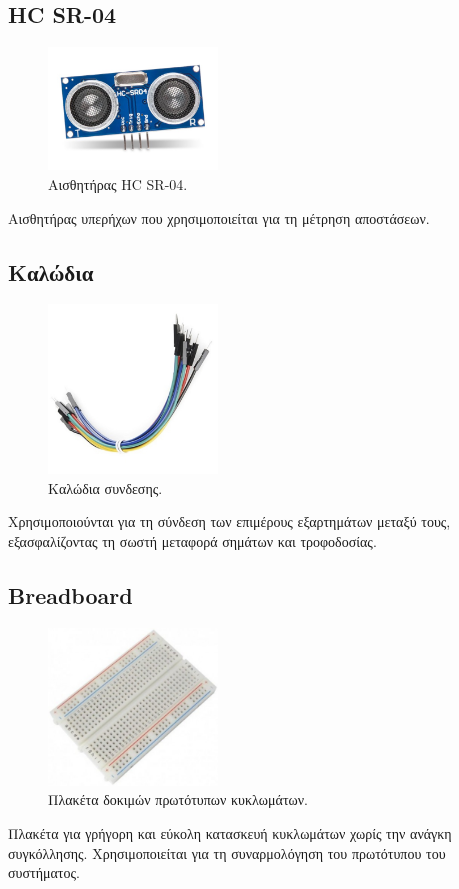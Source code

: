 \documentclass[conference]{IEEEtran}
\begin{document}
\subsection{HC SR-04}
\begin{figure}[H]
	\centerline{\includegraphics[width=0.4\textwidth]{assets/hcsr04.jpeg}}
	\caption{Αισθητήρας HC SR-04.}
\end{figure}
Αισθητήρας υπερήχων που χρησιμοποιείται για τη μέτρηση αποστάσεων.

\subsection{Καλώδια}
\begin{figure}[H]
	\centerline{\includegraphics[width=0.4\textwidth]{assets/cables.jpg}}
	\caption{Καλώδια συνδεσης.}
\end{figure}
Χρησιμοποιούνται για τη σύνδεση των επιμέρους εξαρτημάτων μεταξύ τους, εξασφαλίζοντας τη σωστή μεταφορά σημάτων και τροφοδοσίας.

\subsection{Breadboard}
\begin{figure}[H]
	\centerline{\includegraphics[width=0.4\textwidth]{assets/breadboard.jpg}}
	\caption{Πλακέτα δοκιμών πρωτότυπων κυκλωμάτων.}
\end{figure}
Πλακέτα για γρήγορη και εύκολη κατασκευή κυκλωμάτων χωρίς την ανάγκη συγκόλλησης. Χρησιμοποιείται για τη συναρμολόγηση του πρωτότυπου του συστήματος.
\end{document}
